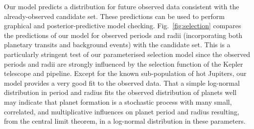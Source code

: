 \documentclass[12pt]{article}
\begin{document}
Our model predicts a distribution for future observed data consistent
with the already-observed candidate set.  These predictions can be
used to perform graphical and posterior-predictive model
checking\cite{Gelman2013}.  Fig.\ \ref{fig:selection} compares the
predictions of our model for observed periods and radii (incorporating
both planetary transits and background events) with the candidate set.
This is a particularly stringent test of our parameterised selection
model since the observed periods and radii are strongly influenced by
the selection function of the Kepler telescope and pipeline.  Except
for the known sub-population of hot
Jupiters\cite{Albrecht2012,Naoz2012}, our model provides a very good
fit to the observed data.  That a simple log-normal distribution in
period and radius fits the observed distribution of planets well may
indicate that planet formation is a stochastic process with many
small, correlated, and multiplicative influences on planet period and
radius resulting, from the central limit theorem, in a log-normal
distribution in these parameters.
\end{document}
